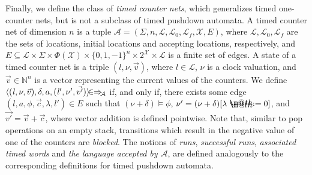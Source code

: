 \documentclass{CSML}
\makeatletter
\theoremstyle{plain}\newtheorem{theorem}[thm]{Theorem}
\theoremstyle{plain}\newtheorem{corollary}[thm]{Corollary}
\theoremstyle{plain}\newtheorem{example}[thm]{Example}
\theoremstyle{plain}\newtheorem{lemma}[thm]{Lemma}
\theoremstyle{plain}\newtheorem{remark}[thm]{Remark}
\newcommand{\N}{\mathbb{N}}
\newcommand{\locs}{\mathcal{L}}
\newcommand{\edges}{E}
\newcommand{\clocks}{\mathcal{X}}
\newcommand{\loc}{\mathit{l}}
\newcommand{\A}{\mathcal{A}}
\newcommand*{\defeq}{\mathrel{\rlap{\raisebox{0.3ex}{$\m@th\cdot$}}\raisebox{-0.3ex}{$\m@th\cdot$}}=}
\newcommand{\transA}{\Rightarrow_{\hspace{-.8mm}\A}}
\makeatother
\begin{document}
Finally, we define the class of \emph{timed counter nets}, which generalizes timed one-counter nets, but is not a subclass of timed pushdown automata. 
A timed counter net of dimension $n$ is a tuple 
$\A=(\Sigma,n,\locs,\locs_0,\locs_f,\clocks, \edges)$, where 
$\locs,\locs_0,\locs_f$ are the sets of locations, initial locations and accepting locations, respectively, and 
$\edges\subseteq \locs\times\Sigma\times\Phi(\clocks)\times\{0,1,-1\}^n\times 2^\clocks\times\locs$ is a finite set of edges. 
A state of a timed counter net is a triple $(\loc,\nu,\vec{v})$, where $\loc\in\locs$, $\nu$ is a clock valuation, and $\vec{v}\in\N^n$ is a vector representing the current values of the counters. We define $\langle(\loc,\nu,\vec{v}),\delta,a,(\loc',\nu',\vec{v'})\rangle\hspace{-1.6mm}\in\transA$ if, and only if, there exists some edge $(\loc,a,\phi,\vec{c},\lambda,\loc')\in\edges$ such that $(\nu+\delta)\models\phi$, $\nu'=(\nu+\delta)[\lambda\defeq 0]$, and $\vec{v'}=\vec{v}+\vec{c}$, where  vector addition is defined pointwise.  Note that, similar to pop operations on an empty stack, transitions which result in the negative value of one of the counters are \emph{blocked}. 
The notions of \emph{runs}, \emph{successful runs}, \emph{associated timed words} and \emph{the language accepted by $\A$}, are defined analogously to the corresponding definitions for timed pushdown automata. 
\end{document}
